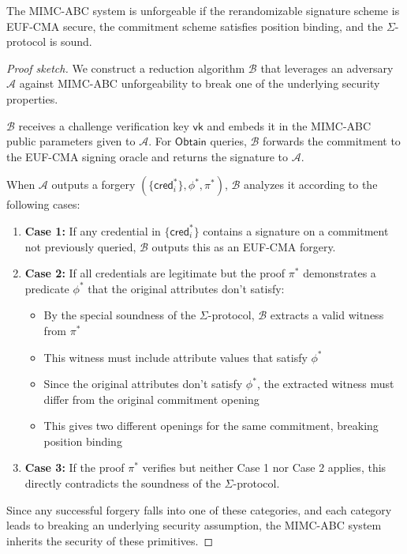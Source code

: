 \begin{theorem}[Unforgeability]
The MIMC-ABC system is unforgeable if the rerandomizable signature scheme is EUF-CMA secure, the commitment scheme satisfies position binding, and the $\Sigma$-protocol is sound.
\end{theorem}

\begin{proof}[Proof sketch]
We construct a reduction algorithm $\mathcal{B}$ that leverages an adversary $\mathcal{A}$ against MIMC-ABC unforgeability to break one of the underlying security properties.

$\mathcal{B}$ receives a challenge verification key $\mathsf{vk}$ and embeds it in the MIMC-ABC public parameters given to $\mathcal{A}$. For $\mathsf{Obtain}$ queries, $\mathcal{B}$ forwards the commitment to the EUF-CMA signing oracle and returns the signature to $\mathcal{A}$.

When $\mathcal{A}$ outputs a forgery $(\{\mathsf{cred}_i^*\}, \phi^*, \pi^*)$, $\mathcal{B}$ analyzes it according to the following cases:

\begin{enumerate}
    \item \textbf{Case 1:} If any credential in $\{\mathsf{cred}_i^*\}$ contains a signature on a commitment not previously queried, $\mathcal{B}$ outputs this as an EUF-CMA forgery.

    \item \textbf{Case 2:} If all credentials are legitimate but the proof $\pi^*$ demonstrates a predicate $\phi^*$ that the original attributes don't satisfy:
    \begin{itemize}
        \item By the special soundness of the $\Sigma$-protocol, $\mathcal{B}$ extracts a valid witness from $\pi^*$
        \item This witness must include attribute values that satisfy $\phi^*$
        \item Since the original attributes don't satisfy $\phi^*$, the extracted witness must differ from the original commitment opening
        \item This gives two different openings for the same commitment, breaking position binding
    \end{itemize}

    \item \textbf{Case 3:} If the proof $\pi^*$ verifies but neither Case 1 nor Case 2 applies, this directly contradicts the soundness of the $\Sigma$-protocol.
\end{enumerate}

Since any successful forgery falls into one of these categories, and each category leads to breaking an underlying security assumption, the MIMC-ABC system inherits the security of these primitives.
\end{proof}

